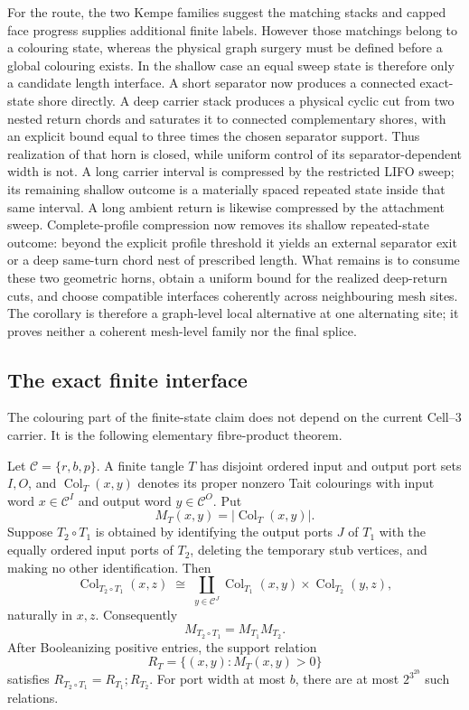 For the route, the two Kempe families suggest the matching stacks and capped
face progress supplies additional finite labels.  However those matchings
belong to a colouring state, whereas the physical graph surgery must be
defined before a global colouring exists.  In the shallow case an equal
sweep state is therefore only a candidate length interface.  A short
separator now produces a connected exact-state shore directly.  A deep
carrier stack produces a physical cyclic cut from two nested return chords
and saturates it to connected complementary shores, with an explicit bound
equal to three times the chosen separator support.  Thus realization of that
horn is closed, while uniform control of its separator-dependent width is
not.  A long carrier interval is compressed by the restricted LIFO sweep;
its remaining shallow outcome is a materially spaced repeated state inside
that same interval.  A long ambient return is likewise compressed by the
attachment sweep.  Complete-profile compression now removes its shallow
repeated-state outcome: beyond the explicit profile threshold it yields an
external separator exit or a deep same-turn chord nest of prescribed length.
What remains is to consume these two geometric horns, obtain a uniform bound
for the realized deep-return cuts, and choose compatible interfaces coherently
across neighbouring mesh sites.  The corollary is therefore a graph-level
local alternative at one alternating site; it proves neither a coherent
mesh-level family nor the final splice.

\subsection{The exact finite interface}

The colouring part of the finite-state claim does not depend on the current
Cell--3 carrier.  It is the following elementary fibre-product theorem.

\begin{theorem}
\label{thm:bounded-interface-count-composition}
\Sprose
Let \(\mathcal C=\{r,b,p\}\).  A finite tangle \(T\) has disjoint ordered
input and output port sets \(I,O\), and
\(\operatorname{Col}_T(x,y)\) denotes its proper nonzero Tait colourings with
input word \(x\in\mathcal C^I\) and output word
\(y\in\mathcal C^O\).  Put
\[
        M_T(x,y)=|\operatorname{Col}_T(x,y)|.
\]
Suppose \(T_2\circ T_1\) is obtained by identifying the output ports \(J\)
of \(T_1\) with the equally ordered input ports of \(T_2\), deleting the
temporary stub vertices, and making no other identification.  Then
\[
 \operatorname{Col}_{T_2\circ T_1}(x,z)
 \;\cong\;
 \coprod_{y\in\mathcal C^J}
       \operatorname{Col}_{T_1}(x,y)\times
       \operatorname{Col}_{T_2}(y,z),                 \tag{C1}
\]
naturally in \(x,z\).  Consequently
\[
                   M_{T_2\circ T_1}=M_{T_1}M_{T_2}.   \tag{C2}
\]
After Booleanizing positive entries, the support relation
\[
 R_T=\{(x,y):M_T(x,y)>0\}
\]
satisfies \(R_{T_2\circ T_1}=R_{T_1};R_{T_2}\).  For port width at most
\(b\), there are at most \(2^{3^{2b}}\) such relations.
\end{theorem}

